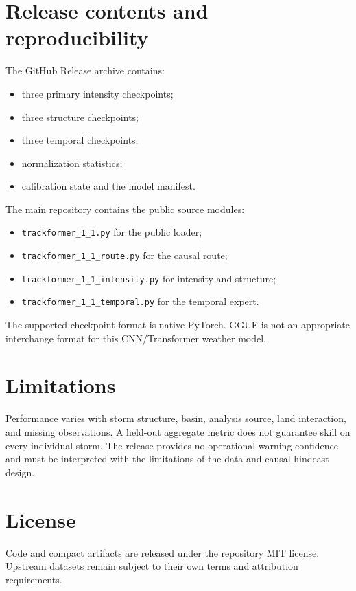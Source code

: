 \documentclass[11pt]{article}
\begin{document}
\section{Release contents and reproducibility}

The GitHub Release archive contains:
\begin{itemize}
\item three primary intensity checkpoints;
\item three structure checkpoints;
\item three temporal checkpoints;
\item normalization statistics;
\item calibration state and the model manifest.
\end{itemize}

The main repository contains the public source modules:
\begin{itemize}
\item \texttt{trackformer\_1\_1.py} for the public loader;
\item \texttt{trackformer\_1\_1\_route.py} for the causal route;
\item \texttt{trackformer\_1\_1\_intensity.py} for intensity and structure;
\item \texttt{trackformer\_1\_1\_temporal.py} for the temporal expert.
\end{itemize}
The supported checkpoint format is native PyTorch.  GGUF is not an
appropriate interchange format for this CNN/Transformer weather model.

\section{Limitations}

Performance varies with storm structure, basin, analysis source, land
interaction, and missing observations.  A held-out aggregate metric does not
guarantee skill on every individual storm.  The release provides no
operational warning confidence and must be interpreted with the limitations
of the data and causal hindcast design.

\section*{License}

Code and compact artifacts are released under the repository MIT license.
Upstream datasets remain subject to their own terms and attribution
requirements.
\end{document}
